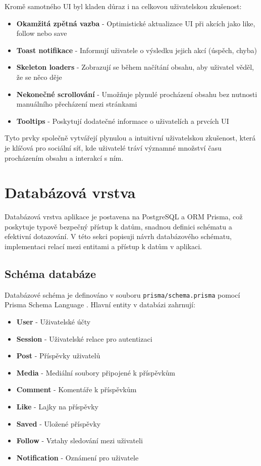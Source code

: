 \documentclass[12pt]{article}
\begin{document}
Kromě samotného UI byl kladen důraz i na celkovou uživatelskou zkušenost:

\begin{itemize}
    \item \textbf{Okamžitá zpětná vazba} - Optimistické aktualizace UI při akcích jako like, follow nebo save
    \item \textbf{Toast notifikace} - Informují uživatele o výsledku jejich akcí (úspěch, chyba)
    \item \textbf{Skeleton loaders} - Zobrazují se během načítání obsahu, aby uživatel věděl, že se něco děje
    \item \textbf{Nekonečné scrollování} - Umožňuje plynulé procházení obsahu bez nutnosti manuálního přecházení mezi stránkami
    \item \textbf{Tooltips} - Poskytují dodatečné informace o uživatelích a prvcích UI
\end{itemize}

Tyto prvky společně vytvářejí plynulou a intuitivní uživatelskou zkušenost, která je klíčová pro sociální síť, kde uživatelé tráví významné množství času procházením obsahu a interakcí s ním.

\newpage
\section{Databázová vrstva}

Databázová vrstva aplikace je postavena na PostgreSQL a ORM Prisma, což poskytuje typově bezpečný přístup k datům, snadnou definici schématu a efektivní dotazování. V této sekci popisuji návrh databázového schématu, implementaci relací mezi entitami a přístup k datům v aplikaci.

\subsection{Schéma databáze}

Databázové schéma je definováno v souboru \texttt{prisma/schema.prisma} pomocí Prisma Schema Language \citep{Prisma2023Schema}. Hlavní entity v databázi zahrnují:

\begin{itemize}
    \item \textbf{User} - Uživatelské účty
    \item \textbf{Session} - Uživatelské relace pro autentizaci
    \item \textbf{Post} - Příspěvky uživatelů
    \item \textbf{Media} - Mediální soubory připojené k příspěvkům
    \item \textbf{Comment} - Komentáře k příspěvkům
    \item \textbf{Like} - Lajky na příspěvky
    \item \textbf{Saved} - Uložené příspěvky
    \item \textbf{Follow} - Vztahy sledování mezi uživateli
    \item \textbf{Notification} - Oznámení pro uživatele
\end{itemize}
\end{document}
